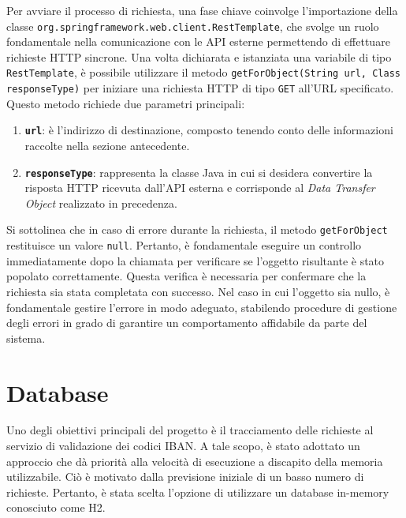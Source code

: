Per avviare il processo di richiesta, una fase chiave coinvolge l'importazione della classe \texttt{org.springframework.web.client.RestTemplate}, che svolge un ruolo fondamentale nella comunicazione con le API esterne permettendo di effettuare richieste HTTP sincrone. Una volta dichiarata e istanziata una variabile di tipo \texttt{RestTemplate}, è possibile utilizzare il metodo \texttt{getForObject(String url, Class responseType)} per iniziare una richiesta HTTP di tipo \texttt{GET} all'URL specificato.\\
Questo metodo richiede due parametri principali:
\begin{enumerate}
    \item \textbf{\texttt{url}}: è l’indirizzo di destinazione, composto tenendo conto delle informazioni raccolte nella sezione antecedente.
    \item \textbf{\texttt{responseType}}: rappresenta la classe Java in cui si desidera convertire la risposta HTTP ricevuta dall'API esterna e corrisponde al \textit{Data Transfer Object} realizzato in precedenza.
\end{enumerate}
Si sottolinea che in caso di errore durante la richiesta, il metodo \texttt{getForObject} restituisce un valore \texttt{null}. Pertanto, è fondamentale eseguire un controllo immediatamente dopo la chiamata per verificare se l'oggetto risultante è stato popolato correttamente. Questa verifica è necessaria per confermare che la richiesta sia stata completata con successo. Nel caso in cui l'oggetto sia nullo, è fondamentale gestire l'errore in modo adeguato, stabilendo procedure di gestione degli errori in grado di garantire un comportamento affidabile da parte del sistema.

\section{Database}

Uno degli obiettivi principali del progetto è il tracciamento delle richieste al servizio di validazione dei codici IBAN. A tale scopo, è stato adottato un approccio che dà priorità alla velocità di esecuzione a discapito della memoria utilizzabile. Ciò è motivato dalla previsione iniziale di un basso numero di richieste. Pertanto, è stata scelta l’opzione di utilizzare un database in-memory conosciuto come H2.

